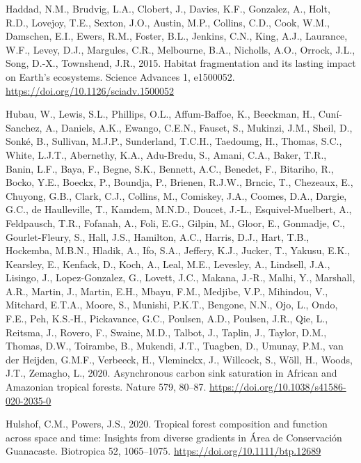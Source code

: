 \documentclass[
  12pt,
]{article}
\newlength{\cslhangindent}
\newlength{\cslentryspacingunit} %
\newenvironment{CSLReferences}[2] %
 {%
  \setlength{\parindent}{0pt}
  \ifodd #1
  \let\oldpar\par
  \def\par{\hangindent=\cslhangindent\oldpar}
  \fi
  \setlength{\parskip}{#2\cslentryspacingunit}
 }%
 {}
\begin{document}
\begin{CSLReferences}{1}{0}
\leavevmode{}%
Haddad, N.M., Brudvig, L.A., Clobert, J., Davies, K.F., Gonzalez, A., Holt, R.D., Lovejoy, T.E., Sexton, J.O., Austin, M.P., Collins, C.D., Cook, W.M., Damschen, E.I., Ewers, R.M., Foster, B.L., Jenkins, C.N., King, A.J., Laurance, W.F., Levey, D.J., Margules, C.R., Melbourne, B.A., Nicholls, A.O., Orrock, J.L., Song, D.-X., Townshend, J.R., 2015. Habitat fragmentation and its lasting impact on {Earth}'s ecosystems. Science Advances 1, e1500052. \url{https://doi.org/10.1126/sciadv.1500052}

\leavevmode{}%
Hubau, W., Lewis, S.L., Phillips, O.L., Affum-Baffoe, K., Beeckman, H., Cuní-Sanchez, A., Daniels, A.K., Ewango, C.E.N., Fauset, S., Mukinzi, J.M., Sheil, D., Sonké, B., Sullivan, M.J.P., Sunderland, T.C.H., Taedoumg, H., Thomas, S.C., White, L.J.T., Abernethy, K.A., Adu-Bredu, S., Amani, C.A., Baker, T.R., Banin, L.F., Baya, F., Begne, S.K., Bennett, A.C., Benedet, F., Bitariho, R., Bocko, Y.E., Boeckx, P., Boundja, P., Brienen, R.J.W., Brncic, T., Chezeaux, E., Chuyong, G.B., Clark, C.J., Collins, M., Comiskey, J.A., Coomes, D.A., Dargie, G.C., de Haulleville, T., Kamdem, M.N.D., Doucet, J.-L., Esquivel-Muelbert, A., Feldpausch, T.R., Fofanah, A., Foli, E.G., Gilpin, M., Gloor, E., Gonmadje, C., Gourlet-Fleury, S., Hall, J.S., Hamilton, A.C., Harris, D.J., Hart, T.B., Hockemba, M.B.N., Hladik, A., Ifo, S.A., Jeffery, K.J., Jucker, T., Yakusu, E.K., Kearsley, E., Kenfack, D., Koch, A., Leal, M.E., Levesley, A., Lindsell, J.A., Lisingo, J., Lopez-Gonzalez, G., Lovett, J.C., Makana, J.-R., Malhi, Y., Marshall, A.R., Martin, J., Martin, E.H., Mbayu, F.M., Medjibe, V.P., Mihindou, V., Mitchard, E.T.A., Moore, S., Munishi, P.K.T., Bengone, N.N., Ojo, L., Ondo, F.E., Peh, K.S.-H., Pickavance, G.C., Poulsen, A.D., Poulsen, J.R., Qie, L., Reitsma, J., Rovero, F., Swaine, M.D., Talbot, J., Taplin, J., Taylor, D.M., Thomas, D.W., Toirambe, B., Mukendi, J.T., Tuagben, D., Umunay, P.M., van der Heijden, G.M.F., Verbeeck, H., Vleminckx, J., Willcock, S., Wöll, H., Woods, J.T., Zemagho, L., 2020. Asynchronous carbon sink saturation in {African} and {Amazonian} tropical forests. Nature 579, 80--87. \url{https://doi.org/10.1038/s41586-020-2035-0}

\leavevmode{}%
Hulshof, C.M., Powers, J.S., 2020. Tropical forest composition and function across space and time: {Insights} from diverse gradients in {Área} de {Conservación Guanacaste}. Biotropica 52, 1065--1075. \url{https://doi.org/10.1111/btp.12689}


\end{CSLReferences}
\end{document}
